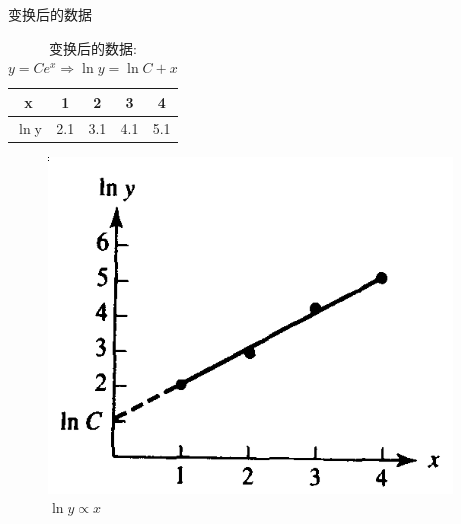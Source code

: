 \documentclass[mathserif]{beamer}
\begin{document}
\begin{frame}{变换后的数据}

  \begin{table}
    \begin{tabular}{c|cccc}
      x & 1 & 2 & 3 & 4\\
      \hline{}
      $\ln{}$y & 2.1 & 3.1 & 4.1 & 5.1
    \end{tabular}
    \caption{变换后的数据: $y = Ce^x \Rightarrow \ln y = \ln C + x$}
  \end{table}

  \begin{figure}
    \includegraphics[height=.4\textheight{}]{lny.png}
    \caption{$\ln{}y \propto x$}
  \end{figure}
\end{frame}
\end{document}
